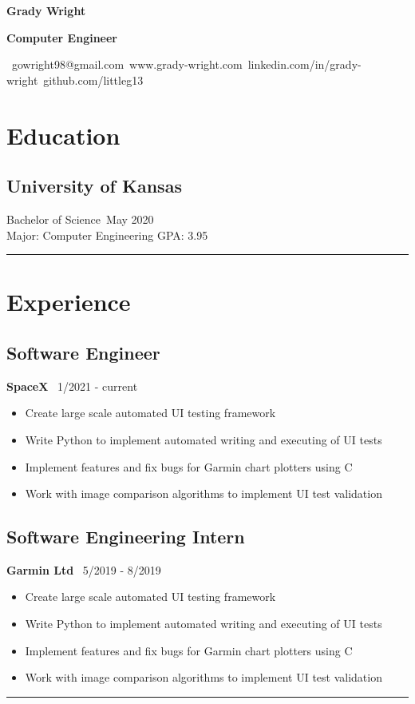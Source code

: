 \documentclass[11pt, letterpaper]{article}
\newenvironment{desItemize}
{ \begin{itemize}[leftmargin=*, topsep=1pt]
    \setlength{\itemsep}{0pt}
    \setlength{\parskip}{0pt}
    \setlength{\parsep}{0pt}
    \small     }
{ \end{itemize}                  }
\newenvironment{leftSection}[1]
{\section*{#1}}
{\rule{\columnwidth + \columnsep/2}{1pt}}
\begin{document}
{\noindent\hspace{-1mm}\Huge\textbf{Grady Wright}\par}
{\vspace{2mm}\noindent\Large\textbf{Computer Engineer}\par}
{\vspace{2mm}\noindent\small\faEnvelope\ gowright98@gmail.com\hfill \faExternalLinkSquare\ www.grady-wright.com\hfill \faLinkedin\ linkedin.com/in/grady-wright\hfill \faGithub\ github.com/littleg13}
\normalsize\vspace{3mm}
\begin{multicols*}{2}[]
    \raggedcolumns
\begin{leftSection}{Education}
    \subsection*{University of Kansas}
    Bachelor of Science\hfill\faCalendar\ May 2020\\
    Major: Computer Engineering \hfill GPA: 3.95
\end{leftSection}
\begin{leftSection}{Experience}
    \subsection*{Software Engineer}
    \textbf{SpaceX}\hfill
    \faCalendar\ 1/2021 - current
    \begin{desItemize}
        \item	Create large scale automated UI testing framework
        \item	Write Python to implement automated writing and executing of UI tests
        \item	Implement features and fix bugs for Garmin chart plotters using C
        \item	Work with image comparison algorithms to implement UI test validation
    \end{desItemize}
    \subsection*{Software Engineering Intern}
    \textbf{Garmin Ltd}\hfill
    \faCalendar\ 5/2019 - 8/2019
    \begin{desItemize}
        \item	Create large scale automated UI testing framework
        \item	Write Python to implement automated writing and executing of UI tests
        \item	Implement features and fix bugs for Garmin chart plotters using C
        \item	Work with image comparison algorithms to implement UI test validation
    \end{desItemize}

\end{leftSection}
\end{multicols*}
\end{document}
